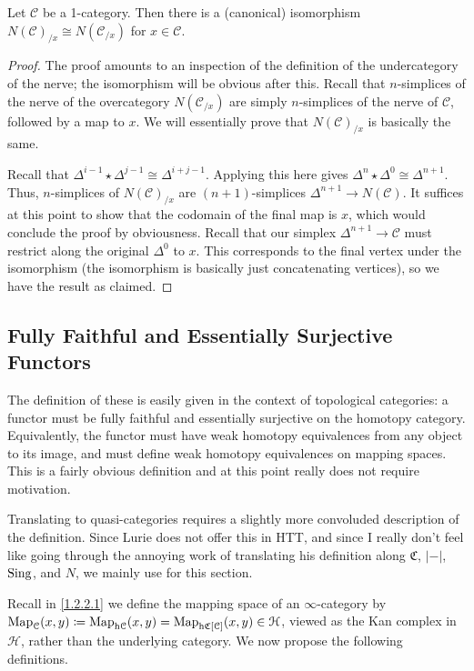 \begin{claim}\label{1.2.9.6}
	Let $\mathcal{C} $ be a 1-category. Then there is a (canonical) isomorphism $N(\mathcal{C} )_{/x} \cong N(\mathcal{C} _{/x} )$ for $x\in \mathcal{C} $.
\end{claim}
\begin{proof}
	The proof amounts to an inspection of the definition of the undercategory of the nerve; the isomorphism will be obvious after this. Recall that $n$-simplices of the nerve of the overcategory $N(\mathcal{C} _{/x} )$ are simply $n$-simplices of the nerve of $\mathcal{C} $, followed by a map to $x$. We will essentially prove that $N(\mathcal{C} )_{/x} $ is basically the same.

	Recall that $\Delta ^{i-1} \star \Delta ^{j-1} \cong \Delta ^{i+j-1} $. Applying this here gives $\Delta ^n\star \Delta ^0\cong \Delta ^{n+1} $. Thus, $n$-simplices of $N(\mathcal{C} )_{/x} $ are $(n+1)$-simplices $\Delta ^{n+1} \to N(\mathcal{C} )$. It suffices at this point to show that the codomain of the final map is $x$, which would conclude the proof by obviousness. Recall that our simplex $\Delta ^{n+1} \to \mathcal{C} $ must restrict along the original $\Delta ^0$ to $x$. This corresponds to the final vertex under the isomorphism (the isomorphism is basically just concatenating vertices), so we have the result as claimed.
\end{proof}

\subsection{Fully Faithful and Essentially Surjective Functors}

The definition of these is easily given in the context of topological categories: a functor must be fully faithful and essentially surjective on the homotopy category. Equivalently, the functor must have weak homotopy equivalences from any object to its image, and must define weak homotopy equivalences on mapping spaces. This is a fairly obvious definition and at this point really does not require motivation.

Translating to quasi-categories requires a slightly more convoluded description of the definition. Since Lurie does not offer this in HTT, and since I really don't feel like going through the annoying work of translating his definition along $\mathfrak{C} $, $\left| - \right| $, $\operatorname{Sing} $, and $N$, we mainly use \cite[01JG]{kerodon} for this section.

Recall in \cref{1.2.2.1} we define the mapping space of an $\infty $-category by $\operatorname{Map}_{\mathcal{C} }(x, y) \coloneqq \operatorname{Map}_{\mathrm{h} \mathcal{C} }(x, y) =\operatorname{Map}_{\mathrm{h} \mathfrak{C} [\mathcal{C} ]}(x, y) \in \mathcal{H} $, viewed as the Kan complex in $\mathcal{H} $, rather than the underlying category. We now propose the following definitions.

